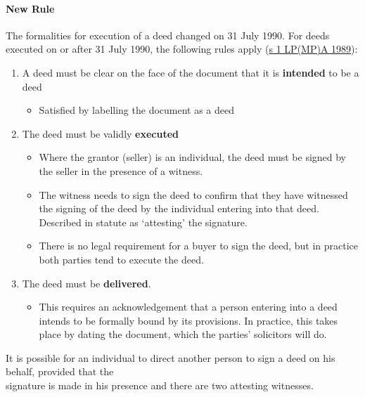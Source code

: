 \documentclass[
]{article}
\providecommand{\tightlist}{%
  \setlength{\itemsep}{0pt}\setlength{\parskip}{0pt}}
\begin{document}
\hypertarget{new-rule}{%
\paragraph{New Rule}\label{new-rule}}

The formalities for execution of a deed changed on 31 July 1990. For
deeds executed on or after 31 July 1990, the following rules apply
(\href{https://www.legislation.gov.uk/ukpga/1989/34/section/1}{s 1
LP(MP)A 1989}):

\begin{enumerate}
\def\labelenumi{\arabic{enumi}.}
\tightlist
\item
  A deed must be clear on the face of the document that it is
  \textbf{intended} to be a deed

  \begin{itemize}
  \tightlist
  \item
    Satisfied by labelling the document as a deed
  \end{itemize}
\item
  The deed must be validly \textbf{executed}

  \begin{itemize}
  \tightlist
  \item
    Where the grantor (seller) is an individual, the deed must be signed
    by the seller in the presence of a witness.
  \item
    The witness needs to sign the deed to confirm that they have
    witnessed the signing of the deed by the individual entering into
    that deed. Described in statute as `attesting' the signature.
  \item
    There is no legal requirement for a buyer to sign the deed, but in
    practice both parties tend to execute the deed.
  \end{itemize}
\item
  The deed must be \textbf{delivered}.

  \begin{itemize}
  \tightlist
  \item
    This requires an acknowledgement that a person entering into a deed
    intends to be formally bound by its provisions. In practice, this
    takes place by dating the document, which the parties' solicitors
    will do.
  \end{itemize}
\end{enumerate}

It is possible for an individual to direct another person to sign a deed
on his behalf, provided that the\\
signature is made in his presence and there are two attesting witnesses.
\end{document}

